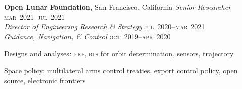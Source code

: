 \documentclass[12pt,letterpaper]{article}
\newenvironment{itemize*}%
{\begin{itemize}%
  \setlength{\itemsep}{0pt}}%
{\end{itemize}}
\newcommand{\rdate}[1]{{\hfill #1}}
\begin{document}
\medskip
\textbf{Open Lunar Foundation,} San Francisco, California \newline
\emph{Senior Researcher} \rdate{\textsc{mar}~2021--\textsc{jul}~2021} \\
\emph{Director of Engineering Research \& Strategy} \rdate{\textsc{jul}~2020--\textsc{mar}~2021} \\
\emph{Guidance, Navigation, \& Control} \rdate{\textsc{oct}~2019--\textsc{apr}~2020}
\begin{itemize*}
  \item Designs and analyses: \textsc{ekf}, \textsc{bls} for orbit determination, sensors, trajectory
  \item Space policy: multilateral arms control treaties, export control policy, open source, electronic frontiers
\end{itemize*}
\end{document}
